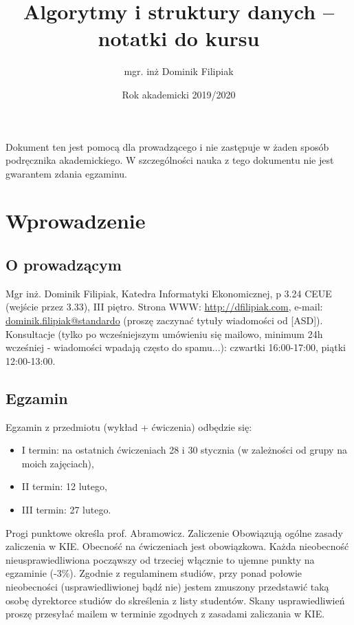 \documentclass[10pt, oneside]{article}
\title{Algorytmy i struktury danych -- notatki do kursu}
\author{mgr. inż Dominik Filipiak}
\date{Rok akademicki 2019/2020}
\theoremstyle{remark}
\begin{document}
\maketitle
\tableofcontents

\vspace{.25in}

Dokument ten jest pomocą dla prowadzącego i nie zastępuje w żaden sposób podręcznika akademickiego.
W szczególności nauka z tego dokumentu nie jest gwarantem zdania egzaminu.

\section{Wprowadzenie}

\subsection{O prowadzącym}
Mgr inż. Dominik Filipiak, Katedra Informatyki Ekonomicznej, p 3.24 CEUE (wejście przez 3.33), III piętro.
Strona WWW: \url{http://dfilipiak.com}, e-mail: \url{dominik.filipiak@standardo} (proszę zaczynać tytuły wiadomości od [ASD]).
Konsultacje (tylko po wcześniejszym umówieniu się mailowo, minimum 24h wcześniej - wiadomości wpadają często do spamu...): czwartki 16:00-17:00, piątki 12:00-13:00.

\subsection{Egzamin}
Egzamin z przedmiotu (wykład + ćwiczenia) odbędzie się:
\begin{itemize}
	\item I termin: na ostatnich ćwiczeniach 28 i 30 stycznia (w zależności od grupy na moich zajęciach),
	\item II termin: 12 lutego,
	\item III termin: 27 lutego.
\end{itemize}
Progi punktowe określa prof. Abramowicz.
Zaliczenie
Obowiązują ogólne zasady zaliczenia w KIE. Obecność na ćwiczeniach jest obowiązkowa. Każda nieobecność nieusprawiedliwiona począwszy od trzeciej włącznie to ujemne punkty na egzaminie (-3\%).
Zgodnie z regulaminem studiów, przy ponad połowie nieobecności (usprawiedliwionej bądź nie) jestem zmuszony przedstawić taką osobę dyrektorce studiów do skreślenia z listy studentów. Skany usprawiedliwień proszę przesyłać mailem w terminie zgodnych z zasadami zaliczania w KIE.
\end{document}
